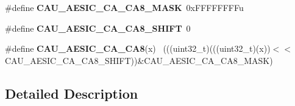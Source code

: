 \begin{DoxyCompactItemize}
\item 
\hypertarget{group___c_a_u___register___masks_ga00cb0732940136f8434d5c19c522ebad}{}\#define {\bfseries C\+A\+U\+\_\+\+A\+E\+S\+I\+C\+\_\+\+C\+A\+\_\+\+C\+A8\+\_\+\+M\+A\+S\+K}~0x\+F\+F\+F\+F\+F\+F\+F\+Fu\label{group___c_a_u___register___masks_ga00cb0732940136f8434d5c19c522ebad}

\item 
\hypertarget{group___c_a_u___register___masks_gaa21e930792a5dae7f0b460040f2fb171}{}\#define {\bfseries C\+A\+U\+\_\+\+A\+E\+S\+I\+C\+\_\+\+C\+A\+\_\+\+C\+A8\+\_\+\+S\+H\+I\+F\+T}~0\label{group___c_a_u___register___masks_gaa21e930792a5dae7f0b460040f2fb171}

\item 
\hypertarget{group___c_a_u___register___masks_ga61cc0b62c2a50cb190a3269c33786890}{}\#define {\bfseries C\+A\+U\+\_\+\+A\+E\+S\+I\+C\+\_\+\+C\+A\+\_\+\+C\+A8}(x)                                        ~(((uint32\+\_\+t)(((uint32\+\_\+t)(x))$<$$<$C\+A\+U\+\_\+\+A\+E\+S\+I\+C\+\_\+\+C\+A\+\_\+\+C\+A8\+\_\+\+S\+H\+I\+F\+T))\&C\+A\+U\+\_\+\+A\+E\+S\+I\+C\+\_\+\+C\+A\+\_\+\+C\+A8\+\_\+\+M\+A\+S\+K)\label{group___c_a_u___register___masks_ga61cc0b62c2a50cb190a3269c33786890}

\end{DoxyCompactItemize}


\subsection{Detailed Description}
